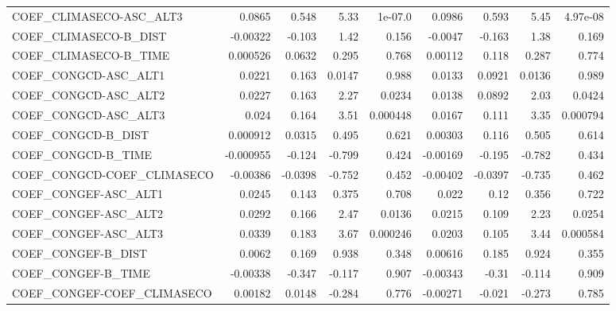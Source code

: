 \begin{tabular}{lrrrrrrrr}
COEF\_CLIMASECO-ASC\_ALT3        &      0.0865 &        0.548 &    5.33 &  1e-07.0 &     0.0986 &       0.593 &         5.45 &      4.97e-08 \\
COEF\_CLIMASECO-B\_DIST          &    -0.00322 &       -0.103 &    1.42 &    0.156 &    -0.0047 &      -0.163 &         1.38 &         0.169 \\
COEF\_CLIMASECO-B\_TIME          &    0.000526 &       0.0632 &   0.295 &    0.768 &    0.00112 &       0.118 &        0.287 &         0.774 \\
COEF\_CONGCD-ASC\_ALT1           &      0.0221 &        0.163 &  0.0147 &    0.988 &     0.0133 &      0.0921 &       0.0136 &         0.989 \\
COEF\_CONGCD-ASC\_ALT2           &      0.0227 &        0.163 &    2.27 &   0.0234 &     0.0138 &      0.0892 &         2.03 &        0.0424 \\
COEF\_CONGCD-ASC\_ALT3           &       0.024 &        0.164 &    3.51 & 0.000448 &     0.0167 &       0.111 &         3.35 &      0.000794 \\
COEF\_CONGCD-B\_DIST             &    0.000912 &       0.0315 &   0.495 &    0.621 &    0.00303 &       0.116 &        0.505 &         0.614 \\
COEF\_CONGCD-B\_TIME             &   -0.000955 &       -0.124 &  -0.799 &    0.424 &   -0.00169 &      -0.195 &       -0.782 &         0.434 \\
COEF\_CONGCD-COEF\_CLIMASECO     &    -0.00386 &      -0.0398 &  -0.752 &    0.452 &   -0.00402 &     -0.0397 &       -0.735 &         0.462 \\
COEF\_CONGEF-ASC\_ALT1           &      0.0245 &        0.143 &   0.375 &    0.708 &      0.022 &        0.12 &        0.356 &         0.722 \\
COEF\_CONGEF-ASC\_ALT2           &      0.0292 &        0.166 &    2.47 &   0.0136 &     0.0215 &       0.109 &         2.23 &        0.0254 \\
COEF\_CONGEF-ASC\_ALT3           &      0.0339 &        0.183 &    3.67 & 0.000246 &     0.0203 &       0.105 &         3.44 &      0.000584 \\
COEF\_CONGEF-B\_DIST             &      0.0062 &        0.169 &   0.938 &    0.348 &    0.00616 &       0.185 &        0.924 &         0.355 \\
COEF\_CONGEF-B\_TIME             &    -0.00338 &       -0.347 &  -0.117 &    0.907 &   -0.00343 &       -0.31 &       -0.114 &         0.909 \\
COEF\_CONGEF-COEF\_CLIMASECO     &     0.00182 &       0.0148 &  -0.284 &    0.776 &   -0.00271 &      -0.021 &       -0.273 &         0.785 \\

\end{tabular}
